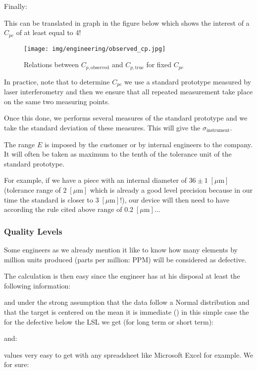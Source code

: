 	Finally:
	
	This can be translated in graph in the figure below which shows the interest of a $C_{pc}$ of at least equal to 4!
	
\begin{figure}[H]
\centering
\texttt{[image: img/engineering/observed\_cp.jpg]}
\caption{Relations between $C_{p,\text{observed}}$ and $C_{p,\text{true}}$ for fixed $C_{pc}$}
\end{figure}

	In practice, note that to determine $C_{pc}$ we use a standard prototype measured by laser interferometry and then we ensure that all repeated measurement take place on the same two measuring points.
	
	Once this done, we performs several measures of the standard prototype and we take the standard deviation of these measures. This will give the $\sigma_{\text{instrument}}$.
	
	The range $E$ is imposed by the customer or by internal engineers to the company. It will often be taken as maximum to the tenth of the tolerance unit of the standard prototype.
	
	For example, if we have a piece with an internal diameter of $36\pm 1\;[\mu \text{m}]$ (tolerance range of $2\; [\mu\text{m}]$ which is already a good level precision because in our time the standard is closer to $3\;[\mu\text{m}]$!), our device will then need to have according the rule cited above range of $0.2\;[\mu\text{m}]$...
	
	\pagebreak
	\subsubsection{Quality Levels}
	
	Some engineers as we already mention it like to know how many elements by million units produced (parts per million: PPM) will be considered as defective.
	
	The calculation is then easy since the engineer has at his disposal at least the following information:
	
	and under the strong assumption that the data follow a Normal distribution and that the target is centered on the mean it is immediate () in this simple case the for the defective below the LSL we get (for long term or short term):
	
	and:
	
	values very easy to get with any spreadsheet like Microsoft Excel for example.
	We for sure:
	
